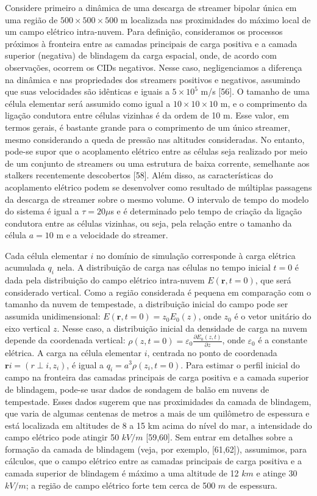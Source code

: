 \documentclass[a4paper, 12pt, onecolumn,singlespacing]{article}
\begin{document}
	Considere primeiro a dinâmica de uma descarga de streamer bipolar única em uma região de $500 \times 500 \times 500$ m localizada nas proximidades do máximo local de um campo elétrico intra-nuvem. Para definição, consideramos os processos próximos à fronteira entre as camadas principais de carga positiva e a camada superior (negativa) de blindagem da carga espacial, onde, de acordo com observações, ocorrem os CIDs negativos. Nesse caso, negligenciamos a diferença na dinâmica e nas propriedades dos streamers positivos e negativos, assumindo que suas velocidades são idênticas e iguais a $5 \times 10^5$ m/s [56]. O tamanho de uma célula elementar será assumido como igual a $10 \times 10 \times 10$ m, e o comprimento da ligação condutora entre células vizinhas é da ordem de 10 m. Esse valor, em termos gerais, é bastante grande para o comprimento de um único streamer, mesmo considerando a queda de pressão nas altitudes consideradas. No entanto, pode-se supor que o acoplamento elétrico entre as células seja realizado por meio de um conjunto de streamers ou uma estrutura de baixa corrente, semelhante aos stalkers recentemente descobertos [58]. Além disso, as características do acoplamento elétrico podem se desenvolver como resultado de múltiplas passagens da descarga de streamer sobre o mesmo volume. O intervalo de tempo do modelo do sistema é igual a $\tau = 20 \mu$s e é determinado pelo tempo de criação da ligação condutora entre as células vizinhas, ou seja, pela relação entre o tamanho da célula $a = 10$ m e a velocidade do streamer.
	
	Cada célula elementar $i$ no domínio de simulação corresponde à carga elétrica acumulada $q_i$ nela. A distribuição de carga nas células no tempo inicial $t = 0$ é dada pela distribuição do campo elétrico intra-nuvem $E(\mathbf{r}, t = 0)$, que será considerado vertical. Como a região considerada é pequena em comparação com o tamanho da nuvem de tempestade, a distribuição inicial do campo pode ser assumida unidimensional: $E(\mathbf{r}, t = 0) = z_0 E_0(z)$, onde $z_0$ é o vetor unitário do eixo vertical $z$. Nesse caso, a distribuição inicial da densidade de carga na nuvem depende da coordenada vertical: $\rho(z, t = 0) = \varepsilon_0 \frac{\partial E_0(z, t)}{\partial z}$, onde $\varepsilon_0$ é a constante elétrica. A carga na célula elementar $i$, centrada no ponto de coordenada $\mathbf{r}i = (r{\perp i}, z_i)$, é igual a $q_i = a^3 \rho(z_i, t = 0)$. Para estimar o perfil inicial do campo na fronteira das camadas principais de carga positiva e a camada superior de blindagem, pode-se usar dados de sondagem de balão em nuvens de tempestade. Esses dados sugerem que nas proximidades da camada de blindagem, que varia de algumas centenas de metros a mais de um quilômetro de espessura e está localizada em altitudes de 8 a 15 km acima do nível do mar, a intensidade do campo elétrico pode atingir 50 $kV/m$ [59,60]. Sem entrar em detalhes sobre a formação da camada de blindagem (veja, por exemplo, [61,62]), assumimos, para cálculos, que o campo elétrico entre as camadas principais de carga positiva e a camada superior de blindagem é máximo a uma altitude de 12 $km$ e atinge 30 $kV/m$; a região de campo elétrico forte tem cerca de 500 $m$ de espessura.
	
\end{document}
